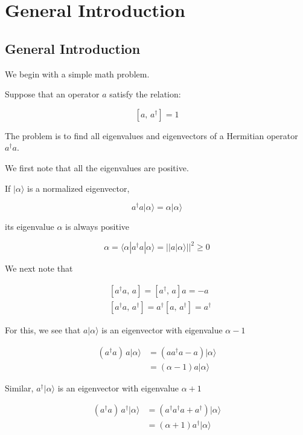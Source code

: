 \chapter{General Introduction}

\section{General Introduction}


We begin with a simple math problem.

Suppose that an operator $a$ satisfy the relation:

\[\left[a,\,a^{\dagger}\right] = 1 \]

The problem is to find all eigenvalues and eigenvectors of a Hermitian operator $a^{\dagger}a$.

We first note that all the eigenvalues are positive.

If $|\alpha\rangle$ is a normalized eigenvector,

\[a^{\dagger}a|\alpha\rangle = \alpha|\alpha\rangle \]

its eigenvalue $\alpha$ is always positive

\[\alpha = \langle\alpha| a^{\dagger}a|\alpha\rangle = ||a|\alpha\rangle||^2 \ge 0 \]

We next note that

\[\begin{split}
&\left[a^{\dagger}a,\,a\right] = \left[a^{\dagger},\, a\right]a = -a \\
&\left[a^{\dagger}a,\,a^{\dagger}\right] = a^{\dagger}\left[a,\,a^{\dagger}\right] = a^{\dagger}
\end{split} \]

For this, we see that $a|\alpha\rangle$ is an eigenvector with eigenvalue $\alpha - 1$

\[\begin{split}
(a^{\dagger}a)\,a|\alpha\rangle &= \left(aa^{\dagger}a -a\right)|\alpha\rangle \\
&=(\alpha - 1)a|\alpha\rangle
\end{split}\]

Similar, $a^{\dagger}|\alpha\rangle$ is an eigenvector with eigenvalue $\alpha + 1$

\[\begin{split}
(a^{\dagger}a)\,a^{\dagger}|\alpha\rangle &= \left(a^{\dagger}a^{\dagger}a + a^{\dagger}\right)|\alpha\rangle \\
&=(\alpha + 1)a^{\dagger}|\alpha\rangle
\end{split}\]

